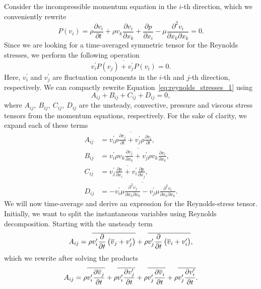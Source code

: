 Consider the incompressible momentum equation in the $i$-th direction, which we conveniently rewrite 
\begin{equation}
	P(v_i) 
	= \rho \frac{\partial v_i}{\partial t}
	+ \rho v_k\frac{\partial v_i}{\partial x_k}
	+ \frac{\partial p}{\partial x_i} 
	- \mu \frac{\partial^2 v_i}{\partial x_k \partial x_k} =0.
\end{equation}
Since we are looking for a time-averaged symmetric tensor for the Reynolds stresses, we perform the following operation
\begin{equation}
	\overline{v_i^\prime P(v_j) + v_j^\prime P(v_i)}=0.
	\label{eq:reynolds_stresses_1}
\end{equation}
Here, $v_i^\prime$ and $v_j^\prime$ are fluctuation components in the $i$-th and $j$-th direction, respectively. We can compactly rewrite Equation~\ref{eq:reynolds_stresses_1} using
\begin{equation}
	A_{ij} + B_{ij} + C_{ij} + D_{ij} = 0,
\end{equation}
where $A_{ij},~B_{ij},~C_{ij},~D_{ij}$ are the unsteady, convective, pressure and viscous stress tensors from the momentum equations, respectively. For the sake of clarity, we expand each of these terms
\begin{align}
	A_{ij} &= \overline{v_i^\prime\rho\frac{\partial v_j}{\partial t} + v_j^\prime\rho\frac{\partial v_i}{\partial t}},\\
	B_{ij} &= \overline{v_i^\prime\rho v_k\frac{\partial v_j}{\partial x_k} + v_j^\prime\rho v_k\frac{\partial v_i}{\partial x_k}},\\
	C_{ij} &= \overline{v_j^\prime\frac{\partial p}{\partial x_i} + v_i^\prime\frac{\partial p}{\partial x_j}}, \\
	D_{ij} &= \overline{-v_i^\prime\mu\frac{\partial^2 v_j}{\partial x_k\partial x_k}-v_j^\prime\mu\frac{\partial^2 v_i}{\partial x_k\partial x_k}}.
\end{align}
We will now time-average and derive an expression for the Reynolds-stress tensor. Initially, we want to split the instantaneous variables using Reynolds decomposition. Starting with the unsteady term
\begin{equation}
	A_{ij}
	=
	\rho\overline{v_i^\prime \frac{\partial}{\partial t}\left(\overline v_j + v_j^\prime \right)} +
	\rho\overline{v_j^\prime \frac{\partial}{\partial t}\left(\overline v_i + v_{i\vphantom{j}}^\prime \right)}, 
\end{equation}
which we rewrite after solving the products
\begin{equation}
	A_{ij}
	=
	\rho \overline{v_i^\prime\frac{\partial\overline v_j^{\vphantom{\prime}}}{\partial t}} 
	+ \rho \overline{v_i^\prime\frac{\partial v_j^\prime}{\partial t}}
	+ \rho \overline{v_j^\prime\frac{\partial\overline v_{i\vphantom{j}}^{\vphantom{\prime}}}{\partial t}} 
	+ \rho \overline{v_j^\prime\frac{\partial v_{i\vphantom{j}}^\prime}{\partial t}}.
	\label{eq:reystress_A_1}
\end{equation}
